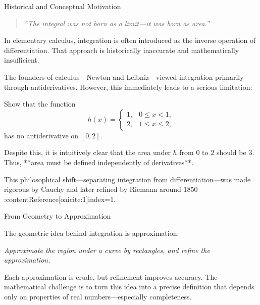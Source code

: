\documentclass[12pt, a4paper]{article}
\begin{document}
\FrontPage
\Large

\begin{heading}
Historical and Conceptual Motivation
\end{heading}

\begin{quote}
\textit{``The integral was not born as a limit—it was born as area.''}
\end{quote}

In elementary calculus, integration is often introduced as the inverse operation of differentiation.
That approach is historically inaccurate and mathematically insufficient.

The founders of calculus—Newton and Leibniz—viewed integration primarily through antiderivatives.
However, this immediately leads to a serious limitation:

\clearpage

\begin{problem}
Show that the function
\[
h(x)=
\begin{cases}
1, & 0\le x<1,\\
2, & 1\le x\le 2,
\end{cases}
\]
has no antiderivative on $[0,2]$.
\end{problem}

\vfill

Despite this, it is intuitively clear that the area under $h$ from $0$ to $2$ should be $3$.
Thus, **area must be defined independently of derivatives**.

This philosophical shift—separating integration from differentiation—was made rigorous by
Cauchy and later refined by Riemann around 1850 :contentReference[oaicite:1]{index=1}.

\clearpage

\begin{heading}
From Geometry to Approximation
\end{heading}

The geometric idea behind integration is approximation:

\begin{center}
\emph{Approximate the region under a curve by rectangles, and refine the approximation.}
\end{center}

Each approximation is crude, but refinement improves accuracy.
The mathematical challenge is to turn this idea into a precise definition that depends
only on properties of real numbers—especially completeness.
\end{document}
